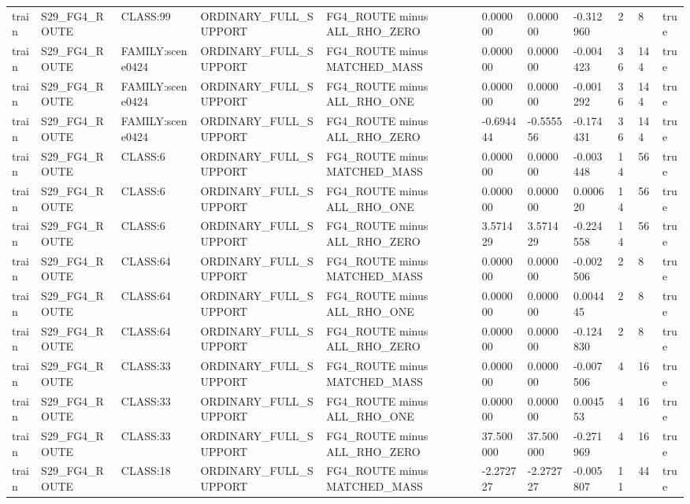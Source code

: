 \begin{tabular}{lllllllllll}
train & S29\_FG4\_ROUTE & CLASS:99 & ORDINARY\_FULL\_SUPPORT & FG4\_ROUTE minus ALL\_RHO\_ZERO & 0.000000 & 0.000000 & -0.312960 & 2 & 8 & true \\
train & S29\_FG4\_ROUTE & FAMILY:scene0424 & ORDINARY\_FULL\_SUPPORT & FG4\_ROUTE minus MATCHED\_MASS & 0.000000 & 0.000000 & -0.004423 & 36 & 144 & true \\
train & S29\_FG4\_ROUTE & FAMILY:scene0424 & ORDINARY\_FULL\_SUPPORT & FG4\_ROUTE minus ALL\_RHO\_ONE & 0.000000 & 0.000000 & -0.001292 & 36 & 144 & true \\
train & S29\_FG4\_ROUTE & FAMILY:scene0424 & ORDINARY\_FULL\_SUPPORT & FG4\_ROUTE minus ALL\_RHO\_ZERO & -0.694444 & -0.555556 & -0.174431 & 36 & 144 & true \\
train & S29\_FG4\_ROUTE & CLASS:6 & ORDINARY\_FULL\_SUPPORT & FG4\_ROUTE minus MATCHED\_MASS & 0.000000 & 0.000000 & -0.003448 & 14 & 56 & true \\
train & S29\_FG4\_ROUTE & CLASS:6 & ORDINARY\_FULL\_SUPPORT & FG4\_ROUTE minus ALL\_RHO\_ONE & 0.000000 & 0.000000 & 0.000620 & 14 & 56 & true \\
train & S29\_FG4\_ROUTE & CLASS:6 & ORDINARY\_FULL\_SUPPORT & FG4\_ROUTE minus ALL\_RHO\_ZERO & 3.571429 & 3.571429 & -0.224558 & 14 & 56 & true \\
train & S29\_FG4\_ROUTE & CLASS:64 & ORDINARY\_FULL\_SUPPORT & FG4\_ROUTE minus MATCHED\_MASS & 0.000000 & 0.000000 & -0.002506 & 2 & 8 & true \\
train & S29\_FG4\_ROUTE & CLASS:64 & ORDINARY\_FULL\_SUPPORT & FG4\_ROUTE minus ALL\_RHO\_ONE & 0.000000 & 0.000000 & 0.004445 & 2 & 8 & true \\
train & S29\_FG4\_ROUTE & CLASS:64 & ORDINARY\_FULL\_SUPPORT & FG4\_ROUTE minus ALL\_RHO\_ZERO & 0.000000 & 0.000000 & -0.124830 & 2 & 8 & true \\
train & S29\_FG4\_ROUTE & CLASS:33 & ORDINARY\_FULL\_SUPPORT & FG4\_ROUTE minus MATCHED\_MASS & 0.000000 & 0.000000 & -0.007506 & 4 & 16 & true \\
train & S29\_FG4\_ROUTE & CLASS:33 & ORDINARY\_FULL\_SUPPORT & FG4\_ROUTE minus ALL\_RHO\_ONE & 0.000000 & 0.000000 & 0.004553 & 4 & 16 & true \\
train & S29\_FG4\_ROUTE & CLASS:33 & ORDINARY\_FULL\_SUPPORT & FG4\_ROUTE minus ALL\_RHO\_ZERO & 37.500000 & 37.500000 & -0.271969 & 4 & 16 & true \\
train & S29\_FG4\_ROUTE & CLASS:18 & ORDINARY\_FULL\_SUPPORT & FG4\_ROUTE minus MATCHED\_MASS & -2.272727 & -2.272727 & -0.005807 & 11 & 44 & true \\

\end{tabular}
